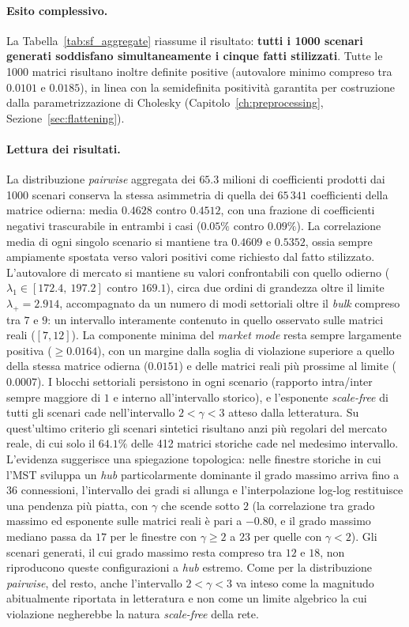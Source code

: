 \paragraph{Esito complessivo.} La Tabella~\ref{tab:sf_aggregate} riassume il risultato: \textbf{tutti i 1000 scenari generati soddisfano simultaneamente i cinque fatti stilizzati}. Tutte le 1000 matrici risultano inoltre definite positive (autovalore minimo compreso tra $0.0101$ e $0.0185$), in linea con la semidefinita positività garantita per costruzione dalla parametrizzazione di Cholesky (Capitolo~\ref{ch:preprocessing}, Sezione~\ref{sec:flattening}).

\paragraph{Lettura dei risultati.} La distribuzione \emph{pairwise} aggregata dei $65.3$ milioni di coefficienti prodotti dai 1000 scenari conserva la stessa asimmetria di quella dei $65\,341$ coefficienti della matrice odierna: media $0.4628$ contro $0.4512$, con una frazione di coefficienti negativi trascurabile in entrambi i casi ($0.05\%$ contro $0.09\%$). La correlazione media di ogni singolo scenario si mantiene tra $0.4609$ e $0.5352$, ossia sempre ampiamente spostata verso valori positivi come richiesto dal fatto stilizzato. L'autovalore di mercato si mantiene su valori confrontabili con quello odierno ($\lambda_1 \in [172.4,\ 197.2]$ contro $169.1$), circa due ordini di grandezza oltre il limite $\lambda_+ = 2.914$, accompagnato da un numero di modi settoriali oltre il \emph{bulk} compreso tra $7$ e $9$: un intervallo interamente contenuto in quello osservato sulle matrici reali ($[7, 12]$). La componente minima del \emph{market mode} resta sempre largamente positiva ($\geq 0.0164$), con un margine dalla soglia di violazione superiore a quello della stessa matrice odierna ($0.0151$) e delle matrici reali più prossime al limite ($0.0007$). I blocchi settoriali persistono in ogni scenario (rapporto intra/inter sempre maggiore di $1$ e interno all'intervallo storico), e l'esponente \emph{scale-free} di tutti gli scenari cade nell'intervallo $2 < \gamma < 3$ atteso dalla letteratura. Su quest'ultimo criterio gli scenari sintetici risultano anzi più regolari del mercato reale, di cui solo il $64.1\%$ delle 412 matrici storiche cade nel medesimo intervallo. L'evidenza suggerisce una spiegazione topologica: nelle finestre storiche in cui l'MST sviluppa un \emph{hub} particolarmente dominante il grado massimo arriva fino a $36$ connessioni, l'intervallo dei gradi si allunga e l'interpolazione log-log restituisce una pendenza più piatta, con $\gamma$ che scende sotto $2$ (la correlazione tra grado massimo ed esponente sulle matrici reali è pari a $-0.80$, e il grado massimo mediano passa da $17$ per le finestre con $\gamma \geq 2$ a $23$ per quelle con $\gamma < 2$). Gli scenari generati, il cui grado massimo resta compreso tra $12$ e $18$, non riproducono queste configurazioni a \emph{hub} estremo. Come per la distribuzione \emph{pairwise}, del resto, anche l'intervallo $2 < \gamma < 3$ va inteso come la magnitudo abitualmente riportata in letteratura e non come un limite algebrico la cui violazione negherebbe la natura \emph{scale-free} della rete.

